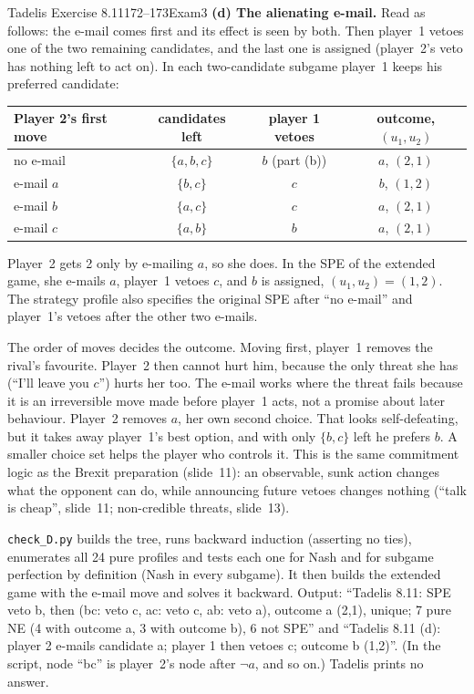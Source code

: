 \begin{exsol}{Tadelis Exercise 8.11}{172--173}{Exam}{3}
\textbf{(d) The alienating e-mail.} Read as follows: the e-mail comes first and its effect is seen
by both. Then player~1 vetoes one of the two remaining candidates, and the last one is assigned
(player~2's veto has nothing left to act on). In each two-candidate subgame player~1 keeps his
preferred candidate:
\begin{center}
\begin{tabular}{lccc}
\toprule
Player 2's first move & candidates left & player 1 vetoes & outcome, $(u_1,u_2)$ \\
\midrule
no e-mail & $\{a,b,c\}$ & $b$ (part (b)) & $a$, $(2,1)$ \\
e-mail $a$ & $\{b,c\}$ & $c$ & $b$, $(1,2)$ \\
e-mail $b$ & $\{a,c\}$ & $c$ & $a$, $(2,1)$ \\
e-mail $c$ & $\{a,b\}$ & $b$ & $a$, $(2,1)$ \\
\bottomrule
\end{tabular}
\end{center}
Player~2 gets 2 only by e-mailing $a$, so she does. In the SPE of the extended game, she e-mails
$a$, player~1 vetoes $c$, and $b$ is assigned, $(u_1,u_2) = (1,2)$. The strategy profile also
specifies the original SPE after ``no e-mail'' and player~1's vetoes after the other two e-mails.

\interp The order of moves decides the outcome. Moving first, player~1 removes the rival's
favourite. Player~2 then cannot hurt him, because the only threat she has (``I'll leave you $c$'')
hurts her too. The e-mail works where the threat fails because it is an irreversible move made
before player~1 acts, not a promise about later behaviour. Player~2 removes $a$, her own second
choice. That looks self-defeating, but it takes away player~1's best option, and with only
$\{b,c\}$ left he prefers $b$. A smaller choice set helps the player who controls it. This is the
same commitment logic as the Brexit preparation (slide~11): an observable, sunk action changes
what the opponent can do, while announcing future vetoes changes nothing (``talk is cheap'', slide~11; non-credible threats, slide~13).

\verify \texttt{check\_D.py} builds the tree, runs backward induction (asserting no ties), enumerates
all 24 pure profiles and tests each one for Nash and for subgame perfection by definition (Nash in
every subgame). It then builds the extended game with the e-mail move and solves it backward.
Output: ``Tadelis 8.11: SPE veto b, then (bc: veto c, ac: veto c, ab: veto a), outcome a (2,1),
unique; 7 pure NE (4 with outcome a, 3 with outcome b), 6 not SPE'' and ``Tadelis 8.11 (d): player
2 e-mails candidate a; player 1 then vetoes c; outcome b (1,2)''. (In the script, node ``bc''
is player~2's node after $\neg a$, and so on.) Tadelis prints no answer.


\end{exsol}
